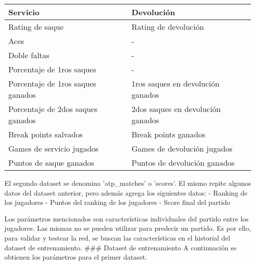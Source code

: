 \documentclass[11pt]{article}
\begin{document}
\begin{longtable}[]{@{}ll@{}}
\toprule
Servicio & Devolución\tabularnewline
\midrule
\endhead
Rating de saque & Rating de devolución\tabularnewline
Aces & -\tabularnewline
Doble faltas & -\tabularnewline
Porcentaje de 1ros saques & -\tabularnewline
Porcentaje de 1ros saques ganados & 1ros saques en devolución
ganados\tabularnewline
Porcentaje de 2dos saques ganados & 2dos saques en devolución
ganados\tabularnewline
Break points salvados & Break points ganados\tabularnewline
Games de servicio jugados & Games de devolución jugados\tabularnewline
Puntos de saque ganados & Puntos de devolución ganados\tabularnewline
\bottomrule
\end{longtable}

El segundo dataset se denomina 'atp\_matches' o 'scores'. El mismo
repite algunos datos del dataset anterior, pero además agrega los
siguientes datos: - Ranking de los jugadores - Puntos del ranking de los
jugadores - Score final del partido

Los parámetros mencionados son características individuales del partido
entre los jugadores. Las mismas no se pueden utilizar para predecir un
partido. Es por ello, para validar y testear la red, se buscan las
características en el historial del dataset de entrenamiento. \#\#\#
Dataset de entrenamiento A continuación se obtienen los parámetros para
el primer dataset.
\end{document}
